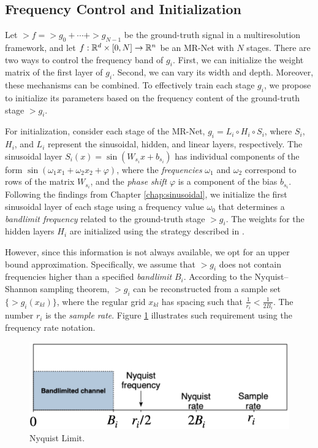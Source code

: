 
\subsection{Frequency Control and Initialization}
\label{sec:frequency-initialization}

Let $\gt{f} = \gt{g}_0 + \cdots + \gt{g}_{N-1}$ be the ground-truth signal in a multiresolution framework, and let $f:\mathbb{R}^d \times [0, N] \to \mathbb{R}^n$ be an MR-Net with $N$ stages. There are two ways to control the frequency band of $g_i$. First, we can initialize the weight matrix of the first layer of $g_i$. Second, we can vary its width and depth. Moreover, these mechanisms can be combined. To effectively train each stage $g_i$, we propose to initialize its parameters based on the frequency content of the ground-truth stage $\gt{g}_i$.


For initialization, consider each stage of the MR-Net, $g_i = L_i \circ H_i \circ S_i$, where $S_i$, $H_i$, and $L_i$ represent the sinusoidal, hidden, and linear layers, respectively. The sinusoidal layer $S_i(x) = \sin(W_{s_i}x + b_{s_i})$ has individual components of the form $\sin(\omega_1 x_1 + \omega_2 x_2 + \varphi)$, where the \textit{frequencies} $\omega_1$ and $\omega_2$ correspond to rows of the matrix $W_{s_i}$, and the \textit{phase shift} $\varphi$ is a component of the bias $b_{s_i}$. Following the findings from Chapter \ref{chap:sinusoidal}, we initialize the first sinusoidal layer of each stage using a frequency value $\omega_0$ that determines a \textit{bandlimit frequency} related to the ground-truth stage $\gt{g}_i$. The weights for the hidden layers $H_i$ are initialized using the strategy described in \cite{sitzmann2019siren}.


However, since this information is not always available, we opt for an upper bound approximation. Specifically, we assume that $\gt{g}_i$ does not contain frequencies higher than a specified \textit{bandlimit} $B_i$. According to the Nyquist–Shannon sampling theorem, $\gt{g}_i$ can be reconstructed from a sample set $\{\gt{g}_i(x_{kl})\}$, where the regular grid $x_{kl}$ has spacing such that $\frac{1}{r_i} < \frac{1}{2B_i}$. The number $r_i$ is the \textit{sample rate}. Figure \ref{f:nyquist} illustrates such requirement using the frequency rate notation.

\begin{figure}[!h]
\centering
\includegraphics[width=0.7\linewidth]{img/ch4/nyquist.png}
\caption{Nyquist Limit.}
\label{f:nyquist}
\end{figure}


